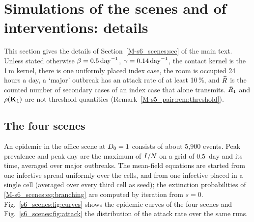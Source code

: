 \section{Simulations of the scenes and of interventions: details}\label{appS_sim:sec}

This section gives the details of Section~\ref{M-s6_scenes:sec} of the main text. Unless stated otherwise
$\beta=0.5\,\mathrm{day}^{-1}$, $\gamma=0.14\,\mathrm{day}^{-1}$, the contact kernel is the 1\,m kernel, there is one uniformly placed index
case, the room is occupied 24 hours a day, a `major' outbreak has an attack rate of at least 10\,\%, and $\widehat{R}$ is
the counted number of secondary cases of an index case that alone transmits. $\bar{R}_1$ and $\rho(\mathbf{K}_1)$ are not
threshold quantities (Remark~\ref{M-s5_pair:rem:threshold}).

\subsection{The four scenes}\label{appS_sim:sec:scenes}

An epidemic in the office scene at $D_0=1$ consists of about 5{,}900 events. Peak prevalence and peak day are the
maximum of $I/N$ on a grid of $0.5$~day and its time, averaged over major outbreaks. The mean-field equations
are started from one infective spread uniformly over the cells, and from one infective placed in a single cell
(averaged over every third cell as seed); the extinction probabilities of \eqref{M-s6_scenes:eq:branching} are
computed by iteration from $s=0$. Fig.~\ref{s6_scenes:fig:curves} shows the epidemic curves of the four scenes
and Fig.~\ref{s6_scenes:fig:attack} the distribution of the attack rate over the same runs.

